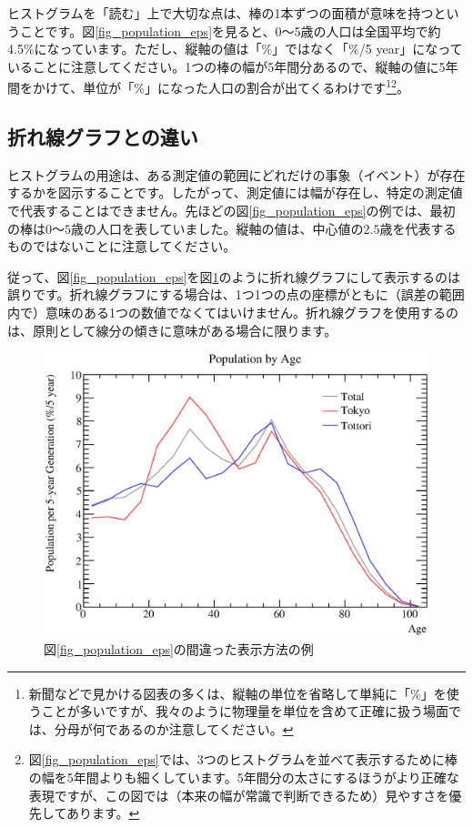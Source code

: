 

ヒストグラムを「読む」上で大切な点は、棒の1本ずつの面積が意味を持つということです。図\ref{fig_population_eps}を見ると、0〜5歳の人口は全国平均で約4.5\%になっています。ただし、縦軸の値は「\%」ではなく「\%/5 year」になっていることに注意してください。1つの棒の幅が5年間分あるので、縦軸の値に5年間をかけて、単位が「\%」になった人口の割合が出てくるわけです\footnote{新聞などで見かける図表の多くは、縦軸の単位を省略して単純に「\%」を使うことが多いですが、我々のように物理量を単位を含めて正確に扱う場面では、分母が何であるのか注意してください。}\footnote{図\ref{fig_population_eps}では、3つのヒストグラムを並べて表示するために棒の幅を5年間よりも細くしています。5年間分の太さにするほうがより正確な表現ですが、この図では（本来の幅が常識で判断できるため）見やすさを優先してあります。}。

\subsection{折れ線グラフとの違い}

ヒストグラムの用途は、ある測定値の範囲にどれだけの事象（イベント）が存在するかを図示することです。したがって、測定値には幅が存在し、特定の測定値で代表することはできません。先ほどの図\ref{fig_population_eps}の例では、最初の棒は$0$〜$5$歳の人口を表していました。縦軸の値は、中心値の$2.5$歳を代表するものではないことに注意してください。

従って、図\ref{fig_population_eps}を図\ref{fig_population2_eps}のように折れ線グラフにして表示するのは誤りです。折れ線グラフにする場合は、1つ1つの点の座標がともに（誤差の範囲内で）意味のある1つの数値でなくてはいけません。折れ線グラフを使用するのは、原則として線分の傾きに意味がある場合に限ります。

\begin{figure}
  \begin{center}
    \includegraphics[width=12cm,clip]{fig/population2.eps}
    \caption{図\ref{fig_population_eps}の間違った表示方法の例}
    \label{fig_population2_eps}
  \end{center}
\end{figure}

